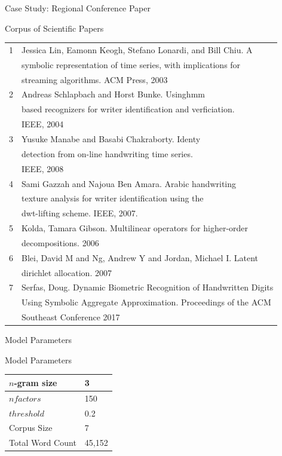 \documentclass[handout]{beamer}
\begin{document}
\begin{frame}{Case Study: Regional Conference Paper}
  \begin{table}
    \centering
    \tiny
    Corpus of Scientific Papers\\
  \begin{tabular}{|l|l|}
    \hline
    1 & Jessica Lin, Eamonn Keogh, Stefano Lonardi, and Bill Chiu. A\\
      & symbolic representation of time series, with implications
        for\\
      & streaming algorithms.  ACM Press, 2003\\
    \hline
    2 & Andreas Schlapbach and Horst Bunke. Usinghmm\\
      & based recognizers for writer identification and
        verficiation.\\
      & IEEE, 2004\\
    \hline
    3 & Yusuke Manabe and Basabi Chakraborty. Identy\\
      & detection from on-line handwriting time series.\\
      & IEEE, 2008\\
    \hline
    4 & Sami Gazzah and Najoua Ben Amara. Arabic handwriting \\
      & texture analysis for writer identification using the \\
      & dwt-lifting scheme.  IEEE, 2007.\\
    \hline
    5 & Kolda, Tamara Gibson. Multilinear operators for higher-order \\
      & decompositions. 2006\\
    \hline
    6 & Blei, David M and Ng, Andrew Y and Jordan, Michael I. Latent\\
      & dirichlet allocation. 2007\\
    \hline
    7 & Serfas, Doug. Dynamic Biometric Recognition of Handwritten Digits\\
      & Using Symbolic Aggregate Approximation. Proceedings of the ACM\\
      & Southeast Conference 2017\\
    \hline
  \end{tabular}
\end{table}
\end{frame}


\begin{frame}{Model Parameters}
    \begin{table}
      \centering
      Model Parameters\\
      \begin{tabular}{ll}
        \hline
        $n$-gram size & 3\\
        \hline
        $nfactors$ &  150 \\
        \hline
        $threshold$ & 0.2\\
        \hline
        Corpus Size & 7\\
        \hline
        Total Word Count & 45,152\\
        \hline
      \end{tabular}
    \end{table}
\end{frame}
\end{document}
